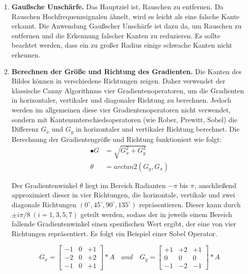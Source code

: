 \begin{enumerate}
	\item \textbf{Gaußsche Unschärfe.} Das Hauptziel ist, Rauschen zu entfernen. Da Rauschen Hochfrequenzsignalen ähnelt, wird es leicht als eine falsche Kante erkannt. Die Anwendung Gaußscher Unschärfe ist dazu da, um Rauschen zu entfernen und die Erkennung falscher Kanten zu reduzieren. Es sollte beachtet werden, dass ein zu großer Radius einige schwache Kanten nicht erkennen.
	\item \textbf{Berechnen der Größe und Richtung des Gradienten.} Die Kanten des Bildes können in verschiedene Richtungen zeigen. Daher verwendet der klassische Canny Algorithmus vier Gradientenoperatoren, um die Gradienten in horizontaler, vertikaler und diagonaler Richtung zu berechnen. Jedoch werden im allgemeinen diese vier Gradientenoperatoren nicht verwendet, sondern mit Kantenunterschiedsoperatoren (wie Rober, Prewitt, Sobel) die Differenz $ G_x $ und $ G_y $ in horizontaler und vertikaler Richtung berechnet. Die Berechnung der Gradientengröße und Richtung funktioniert wie folgt:	
\begin{equation}
\begin{split}
•  G   & = \sqrt{G_x^{2} + G_y^{2}} \\
\theta & = arctan2(G_y,G_x)
\end{split}
\end{equation}

Der Gradientenwinkel $ \theta $ liegt im Bereich Radianten $ -\pi $ bis $ \pi $, anschließend approximiert dieser in vier Richtungen, die horizontale, vertikale und zwei diagonale Richtungen $(0^{\circ}, 45^{\circ}, 90^{\circ}, 135^{\circ}) $ repräsentieren. Dieser kann durch $  \pm i \pi / 8\ (i =1, 3, 5, 7) $ geteilt werden, sodass der in jeweils einem Bereich fallende Gradientenwinkel einen spezifischen Wert ergibt, der eine von vier Richtungen repräsentiert. Es folgt ein Beispiel einer Sobel Operator.

\begin{equation}
G_x = \begin{bmatrix}
-1 &0 &+1 \\
-2 &0 &+2 \\
-1 &0 &+1
\end{bmatrix} * A \quad and \quad G_y = \begin{bmatrix}
+1 &+2 &+1 \\
0 &0 &0 \\
-1 &-2 &-1
\end{bmatrix} * A
\end{equation}
	

\end{enumerate}
